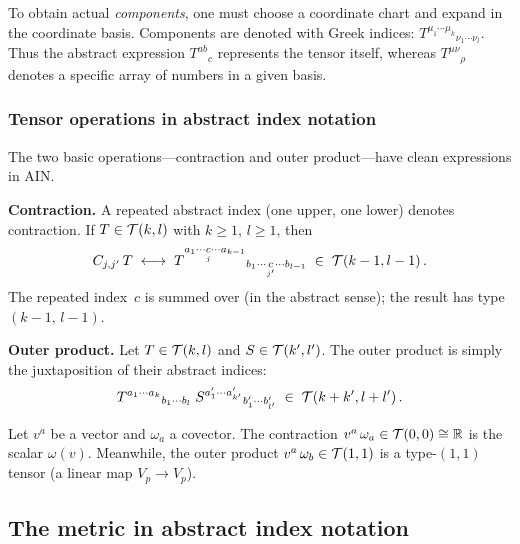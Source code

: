 \begin{remark}
  To obtain actual \emph{components}, one must choose a coordinate
  chart and expand in the coordinate basis.  Components are
  denoted with Greek indices:
  $T^{\mu_1\cdots\mu_k}{}_{\nu_1\cdots\nu_l}$.  Thus the
  abstract expression $T^{ab}{}_{c}$ represents the tensor
  itself, whereas
  $T^{\mu\nu}{}_{\rho}$ denotes a specific array of numbers in a
  given basis.
\end{remark}

\subsubsection{Tensor operations in abstract index notation}%
\label{sec:ain-operations}

The two basic operations---contraction and outer product---have
clean expressions in AIN.

\medskip\noindent
\textbf{Contraction.}\;
A repeated abstract index (one upper, one lower) denotes
contraction.  If $T\in\mathcal{T}(k,l)$ with $k\geq 1$,
$l\geq 1$, then
\begin{equation}\label{eq:ain-contraction}
  C_{j,j'}\, T
  \;\longleftrightarrow\;
  T^{a_1\cdots \underset{j}{c} \cdots a_{k-1}}{}%
    _{b_1\cdots \underset{j'}{c} \cdots b_{l-1}}
  \;\in\; \ttype{k-1}{l-1}\,.
\end{equation}
The repeated index~$c$ is summed over (in the abstract sense);
the result has type $(k-1,\,l-1)$.

\medskip\noindent
\textbf{Outer product.}\;
Let $T\in\mathcal{T}(k,l)$ and $S\in\mathcal{T}(k',l')$.  The outer
product is simply the juxtaposition of their abstract indices:
\begin{equation}\label{eq:ain-outer}
  T^{a_1\cdots a_k}{}_{b_1\cdots b_l}\;
  S^{a'_1\cdots a'_{k'}}{}_{b'_1\cdots b'_{l'}}
  \;\in\; \mathcal{T}(k+k',l+l')\,.
\end{equation}

\begin{example}\label{ex:ain-contraction}
  Let $v^a$ be a vector and $\omega_a$ a covector.  The
  contraction $v^a\,\omega_a \in \mathcal{T}(0,0) \cong \mathbb{R}$ is
  the scalar $\omega(v)$.  Meanwhile, the outer product
  $v^a\,\omega_b \in \mathcal{T}(1,1)$ is a type-$(1,1)$ tensor
  (a linear map $V_p\to V_p$).
\end{example}

\subsection{The metric in abstract index notation}%
\label{sec:ain-metric}

